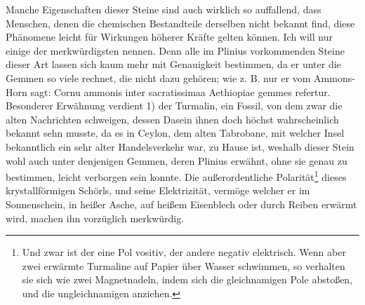 \documentclass[a4paper, 11pt, oneside, polutonikogreek, german]{article}
\begin{document}
Manche Eigenschaften dieser Steine sind auch wirklich so auffallend, dass Menschen, denen die chemischen Bestandteile derselben nicht bekannt find, diese Phänomene leicht für Wirkungen höherer Kräfte gelten können. Ich will nur einige der merkwürdigsten nennen. Denn alle im Plinius vorkommenden Steine dieser Art lassen sich kaum mehr mit Genauigkeit bestimmen, da er unter die Gemmen so viele rechnet, die nicht dazu gehören; wie z. B. nur er vom Ammons-Horn sagt: Cornu ammonis inter sacratissimaa Aethiopiae gemmes refertur. Besonderer Erwähnung verdient 1) der Turmalin, ein Fossil, von dem zwar die alten Nachrichten schweigen, dessen Dasein ihnen doch höchst wahrscheinlich bekannt sehn musste, da es in Ceylon, dem alten Tabrobane, mit welcher Insel bekanntlich ein sehr alter Handelsverkehr war, zu Hause ist, weshalb dieser Stein wohl auch unter denjenigen Gemmen, deren Plinius erwähnt, ohne sie genau zu bestimmen, leicht verborgen sein konnte. Die außerordentliche Polarität\footnote{Und zwar ist der eine Pol vositiv, der andere negativ elektrisch. Wenn aber zwei erwärmte Turmaline auf Papier über Wasser schwimmen, so verhalten sie sich wie zwei Magnetnadeln, indem sich die gleichnamigen Pole abstoßen, und die ungleichnamigen anziehen.} dieses krystallförmigen Schörls, und seine Elektrizität, vermöge welcher er im Sonnenschein, in heißer Asche, auf heißem Eisenblech oder durch Reiben erwärmt wird, machen ihn vorzüglich merkwürdig.
\end{document}

